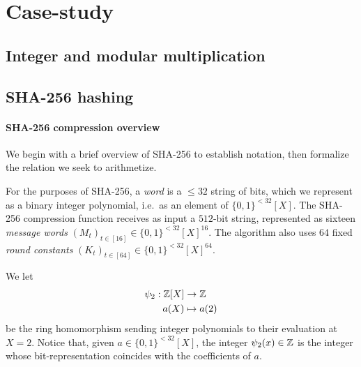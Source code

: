 \documentclass[11pt,letterpaper,usenames,dvipsnames]{article}
\begin{document}



\section{Case-study}


\subsection{Integer and modular multiplication}


\subsection{SHA-256 hashing}


\paragraph{SHA-256 compression overview}
We begin with a brief overview of SHA-256 to establish notation, then formalize the relation we seek to arithmetize.



For the purposes of SHA-256, a \emph{word} is a $\leq 32$ string of bits, which we represent as a binary integer polynomial, i.e.\ as an element of $\{0,1\}^{<32}[X]$.
The SHA-256 compression function receives as input a $512$-bit string, represented as sixteen \emph{message words} $(M_t)_{t\in[16]}\in\{0,1\}^{<32}[X]^{16}$. 
The algorithm also uses $64$ fixed \emph{round constants} $(K_t)_{t\in[64]}\in\{0,1\}^{<32}[X]^{64}$. 

We let 
%
\begin{equation}
\begin{aligned}
\psi_2: \mathbb{Z}[X]& \to \mathbb{Z}\\
a(X) &\mapsto a(2)
\end{aligned}
\end{equation}
be the ring homomorphism sending integer polynomials to their evaluation at $X=2$. Notice that, given $a\in \{0,1\}^{<32}[X]$, the integer $\psi_2(x) \in \mathbb{Z}$ is the integer whose bit-representation coincides with the coefficients of $a$.
\end{document}
